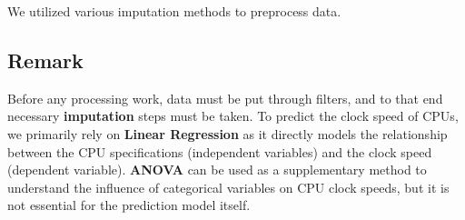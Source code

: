 We utilized various imputation methods to preprocess data.\\

\subsection{Remark}
Before any processing work, data must be put through filters, and to that end necessary \textbf{imputation} steps must be taken. To predict the clock speed of CPUs, we primarily rely on \textbf{Linear Regression} as it directly models the relationship between the CPU specifications (independent variables) and the clock speed (dependent variable). \textbf{ANOVA} can be used as a supplementary method to understand the influence of categorical variables on CPU clock speeds, but it is not essential for the prediction model itself.

\newpage